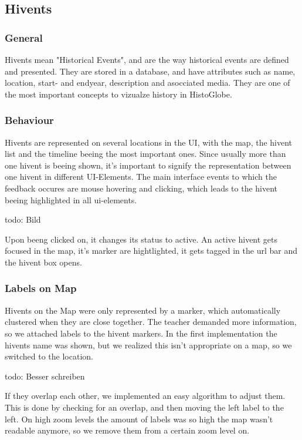 \subsection{Hivents} %
\label{sec:hivents}
\subsubsection{General} %
\label{sub:general}
Hivents mean "Historical Events", and are the way historical events are defined and presented. They are stored in a database, and have attributes such as name, location, start- and endyear, description and asocciated media.
They are one of the most important concepts to vizualze history in HistoGlobe.

\subsubsection{Behaviour} %
\label{sub:behaviour}
Hivents are represented on several locations in the UI, with the map, the hivent list and the timeline beeing the most important ones.
Since usually more than one hivent is beeing shown, it's important to signify the representation between one hivent in different UI-Elements.
The main interface events to which the feedback occures are mouse hovering and clicking, which leads to the hivent beeing highlighted in all ui-elements.

todo: Bild

Upon beeng clicked on, it changes its status to active. An active hivent gets focused in the map, it's marker are hightlighted, it gets tagged in the url bar and the hivent box opens.

\subsubsection{Labels on Map}
Hivents on the Map were only represented by a marker, which automatically clustered when they are close together.
The teacher demanded more information, so we attached labels to the hivent markers.
In the first implementation the hivents name was shown, but we realized this isn't appropriate on a map, so we switched to the location.

todo: Besser schreiben

If they overlap each other, we implemented an easy algorithm to adjust them. 
This is done by checking for an overlap, and then moving the left label to the left.
On high zoom levels the amount of labels was so high the map wasn't readable anymore, so we remove them from a certain zoom level on.


